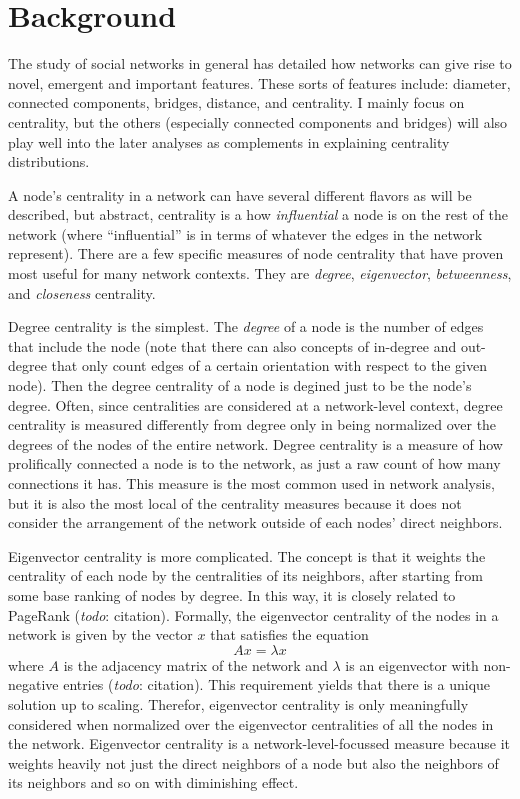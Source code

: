 \documentclass{article}
\newcommand{\todo}[1]{\textit{todo}: #1}
\renewcommand{\it}{\textit}
\begin{document}
\section{Background}
\label{sec:background}

The study of social networks in general has detailed how networks can give rise to novel, emergent and important features.
These sorts of features include: diameter, connected components, bridges, distance, and centrality.
I mainly focus on centrality, but the others (especially connected components and bridges) will also play well into the later analyses as complements in explaining centrality distributions.

A node's centrality in a network can have several different flavors as will be described, but abstract, centrality is a how \it{influential} a node is on the rest of the network (where ``influential'' is in terms of whatever the edges in the network represent).
There are a few specific measures of node centrality that have proven most useful for many network contexts.
They are \it{degree}, \it{eigenvector}, \it{betweenness}, and \it{closeness} centrality.

Degree centrality is the simplest.
The \it{degree} of a node is the number of edges that include the node (note that there can also concepts of in-degree and out-degree that only count edges of a certain orientation with respect to the given node).
Then the degree centrality of a node is degined just to be the node's degree.
Often, since centralities are considered at a network-level context, degree centrality is measured differently from degree only in being normalized over the degrees of the nodes of the entire network.
Degree centrality is a measure of how prolifically connected a node is to the network, as just a raw count of how many connections it has.
This measure is the most common used in network analysis, but it is also the most local of the centrality measures because it does not consider the arrangement of the network outside of each nodes' direct neighbors.

Eigenvector centrality is more complicated.
The concept is that it weights the centrality of each node by the centralities of its neighbors, after starting from some base ranking of nodes by degree.
In this way, it is closely related to PageRank (\todo{citation}).
Formally, the eigenvector centrality of the nodes in a network is given by the vector $x$ that satisfies the equation $$ A x = \lambda x $$ where $A$ is the adjacency matrix of the network and $\lambda$ is an eigenvector with non-negative entries (\todo{citation}).
This requirement yields that there is a unique solution up to scaling. Therefor, eigenvector centrality is only meaningfully considered when normalized over the eigenvector centralities of all the nodes in the network.
Eigenvector centrality is a network-level-focussed measure because it weights heavily not just the direct neighbors of a node but also the neighbors of its neighbors and so on with diminishing effect.
\end{document}
